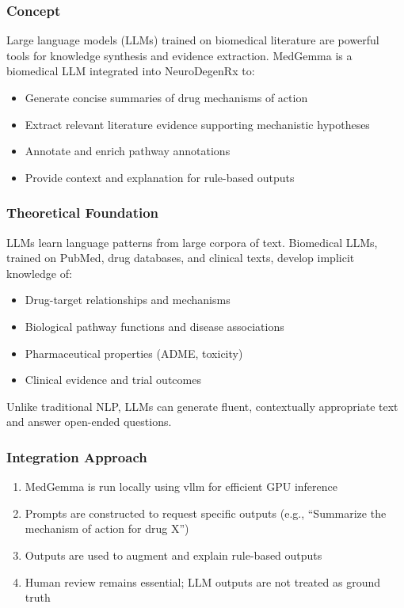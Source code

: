 \documentclass[12pt,a4paper]{article}
\begin{document}
\subsubsection{Concept}
Large language models (LLMs) trained on biomedical literature are powerful tools for knowledge synthesis and evidence extraction. MedGemma is a biomedical LLM integrated into NeuroDegenRx to:
\begin{itemize}
  \item Generate concise summaries of drug mechanisms of action
  \item Extract relevant literature evidence supporting mechanistic hypotheses
  \item Annotate and enrich pathway annotations
  \item Provide context and explanation for rule-based outputs
\end{itemize}

\subsubsection{Theoretical Foundation}
LLMs learn language patterns from large corpora of text. Biomedical LLMs, trained on PubMed, drug databases, and clinical texts, develop implicit knowledge of:
\begin{itemize}
  \item Drug-target relationships and mechanisms
  \item Biological pathway functions and disease associations
  \item Pharmaceutical properties (ADME, toxicity)
  \item Clinical evidence and trial outcomes
\end{itemize}

Unlike traditional NLP, LLMs can generate fluent, contextually appropriate text and answer open-ended questions.

\subsubsection{Integration Approach}
\begin{enumerate}
  \item MedGemma is run locally using vllm for efficient GPU inference
  \item Prompts are constructed to request specific outputs (e.g., ``Summarize the mechanism of action for drug X'')
  \item Outputs are used to augment and explain rule-based outputs
  \item Human review remains essential; LLM outputs are not treated as ground truth
\end{enumerate}
\end{document}
